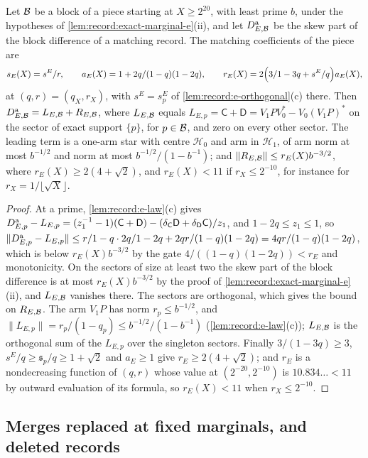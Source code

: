 \begin{lemma}\label{lem:oct24:matching-star}
Let $\Blk$ be a block of a piece starting at $X\ge2^{20}$, with least prime $b$,
under the hypotheses of \cref{lem:record:exact-marginal-e}(ii), and let
$D^{\rm a}_{E,\Blk}$ be the skew part of the block difference of a matching record.
The matching coefficients of the piece are
\[
 s_E(X)=\frac{s^E}r,\qquad a_E(X)=\frac{1+2q}{(1-q)(1-2q)},\qquad
 r_E(X)=2\Bigl(\frac3{1-3q}+\frac{s^E}q\Bigr)a_E(X),
\]
at $(q,r)=(q_X,r_X)$, with $s^E=s^E_p$ of \cref{lem:record:e-orthogonal}(c) there.
Then $D^{\rm a}_{E,\Blk}=L_{E,\Blk}+R_{E,\Blk}$, where $L_{E,\Blk}$ equals
$L_{E,p}=\mathsf C+\mathsf D=V_1PV_0^*-V_0(V_1P)^*$ on the sector of exact support
$\{p\}$, for $p\in\Blk$, and zero on every other sector. The leading term is a
one-arm star with centre $\mathcal H_0$ and arm in $\mathcal H_1$, of arm norm at most
$b^{-1/2}$ and norm at most $b^{-1/2}/(1-b^{-1})$; and
$\|R_{E,\Blk}\|\le r_E(X)b^{-3/2}$, where $r_E(X)\ge2(4+\sqrt2)$, and $r_E(X)<11$ if
$r_X\le2^{-10}$, for instance for $r_X=1/\lfloor\sqrt X\rfloor$.
\end{lemma}

\begin{proof}
At a prime, \cref{lem:record:e-law}(c) gives
$D^{\rm a}_{E,p}-L_{E,p}=(z_1^{-1}-1)(\mathsf C+\mathsf D)-(\delta_{\mathsf C}\mathsf D+
\delta_{\mathsf D}\mathsf C)/z_1$, and $1-2q\le z_1\le1$, so
$\|D^{\rm a}_{E,p}-L_{E,p}\|\le\frac r{1-q}\cdot\frac{2q}{1-2q}+\frac{2qr}{(1-q)(1-2q)}
=\frac{4qr}{(1-q)(1-2q)}$, which is below $r_E(X)b^{-3/2}$ by the gate
$4/((1-q)(1-2q))<r_E$ and monotonicity. On the sectors of size at least two the
skew part of the block difference is at most $r_E(X)b^{-3/2}$ by the proof of
\cref{lem:record:exact-marginal-e}(ii), and $L_{E,\Blk}$ vanishes there. The
sectors are orthogonal, which gives the bound on $R_{E,\Blk}$. The arm $V_1P$ has
norm $r_p\le b^{-1/2}$, and $\|L_{E,p}\|=r_p/(1-q_p)\le b^{-1/2}/(1-b^{-1})$
(\cref{lem:record:e-law}(c)); $L_{E,\Blk}$ is the orthogonal sum of the $L_{E,p}$
over the singleton sectors. Finally $3/(1-3q)\ge3$, $s^E/q\ge\mathfrak s_p/q\ge
1+\sqrt2$ and $a_E\ge1$ give $r_E\ge2(4+\sqrt2)$; and $r_E$ is a nondecreasing
function of $(q,r)$ whose value at $(2^{-20},2^{-10})$ is
$10.834\ldots<11$ by outward evaluation of its formula, so
$r_E(X)<11$ when $r_X\le2^{-10}$.
\end{proof}

\subsection{Merges replaced at fixed marginals, and deleted records}\label{subsec:merge-repair}

